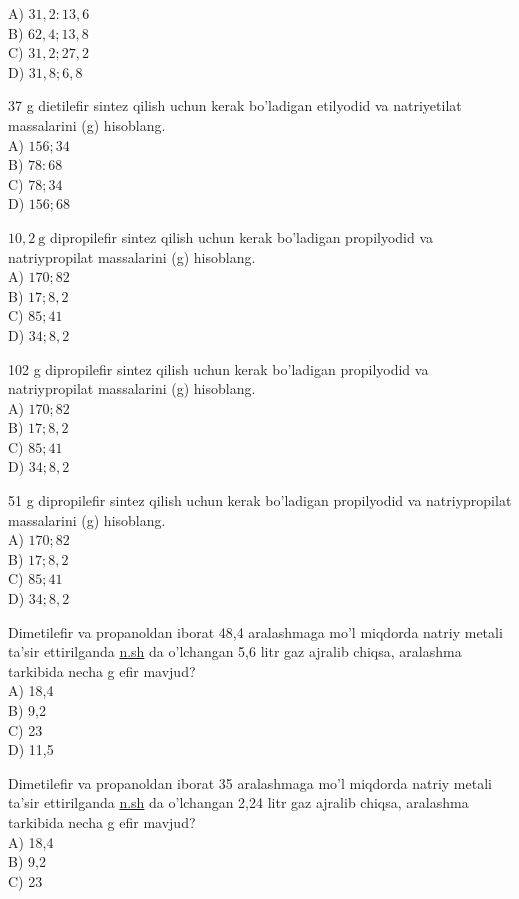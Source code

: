 A) $31,2: 13,6$\\
B) $62,4 ; 13,8$\\
C) $31,2 ; 27,2$\\
D) $31,8 ; 6,8$
  \item 37 g dietilefir sintez qilish uchun kerak bo'ladigan etilyodid va natriyetilat massalarini (g) hisoblang.\\
A) $156 ; 34$\\
B) $78: 68$\\
C) $78 ; 34$\\
D) $156 ; 68$
  \item $10,2 \mathrm{~g}$ dipropilefir sintez qilish uchun kerak bo'ladigan propilyodid va natriypropilat massalarini (g) hisoblang.\\
A) $170 ; 82$\\
B) $17 ; 8,2$\\
C) $85 ; 41$\\
D) $34 ; 8,2$
  \item 102 g dipropilefir sintez qilish uchun kerak bo'ladigan propilyodid va natriypropilat massalarini (g) hisoblang.\\
A) $170 ; 82$\\
B) $17 ; 8,2$\\
C) $85 ; 41$\\
D) $34 ; 8,2$
  \item 51 g dipropilefir sintez qilish uchun kerak bo'ladigan propilyodid va natriypropilat massalarini (g) hisoblang.\\
A) $170 ; 82$\\
B) $17 ; 8,2$\\
C) $85 ; 41$\\
D) $34 ; 8,2$
  \item Dimetilefir va propanoldan iborat 48,4 aralashmaga mo'l miqdorda natriy metali ta'sir ettirilganda \href{http://n.sh}{n.sh} da o'lchangan 5,6 litr gaz ajralib chiqsa, aralashma tarkibida necha g efir mavjud?\\
A) 18,4\\
B) 9,2\\
C) 23\\
D) 11,5
  \item Dimetilefir va propanoldan iborat 35 aralashmaga mo'l miqdorda natriy metali ta'sir ettirilganda \href{http://n.sh}{n.sh} da o'lchangan 2,24 litr gaz ajralib chiqsa, aralashma tarkibida necha g efir mavjud?\\
A) 18,4\\
B) 9,2\\
C) 23\\

